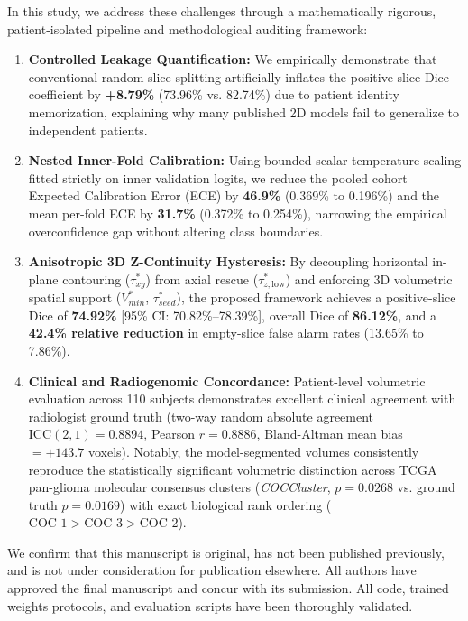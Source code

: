 \documentclass[11pt]{article}
\begin{document}
\vspace{0.6em}
In this study, we address these challenges through a mathematically rigorous, patient-isolated pipeline and methodological auditing framework:
\begin{enumerate}
    \item \textbf{Controlled Leakage Quantification:} We empirically demonstrate that conventional random slice splitting artificially inflates the positive-slice Dice coefficient by \textbf{+8.79\%} (73.96\% vs. 82.74\%) due to patient identity memorization, explaining why many published 2D models fail to generalize to independent patients.
    \item \textbf{Nested Inner-Fold Calibration:} Using bounded scalar temperature scaling fitted strictly on inner validation logits, we reduce the pooled cohort Expected Calibration Error (ECE) by \textbf{46.9\%} (0.369\% to 0.196\%) and the mean per-fold ECE by \textbf{31.7\%} (0.372\% to 0.254\%), narrowing the empirical overconfidence gap without altering class boundaries.
    \item \textbf{Anisotropic 3D Z-Continuity Hysteresis:} By decoupling horizontal in-plane contouring ($\tau_{xy}^*$) from axial rescue ($\tau_{z,\mathrm{low}}^*$) and enforcing 3D volumetric spatial support ($V_{min}^*$, $\tau_{seed}^*$), the proposed framework achieves a positive-slice Dice of \textbf{74.92\%} [95\% CI: 70.82\%--78.39\%], overall Dice of \textbf{86.12\%}, and a \textbf{42.4\% relative reduction} in empty-slice false alarm rates (13.65\% to 7.86\%).
    \item \textbf{Clinical and Radiogenomic Concordance:} Patient-level volumetric evaluation across 110 subjects demonstrates excellent clinical agreement with radiologist ground truth (two-way random absolute agreement $\text{ICC}(2, 1) = \mathbf{0.8894}$, Pearson $r = 0.8886$, Bland-Altman mean bias $= +143.7$ voxels). Notably, the model-segmented volumes consistently reproduce the statistically significant volumetric distinction across TCGA pan-glioma molecular consensus clusters (\textit{COCCluster}, $p = 0.0268$ vs. ground truth $p = 0.0169$) with exact biological rank ordering ($\text{COC 1} > \text{COC 3} > \text{COC 2}$).
\end{enumerate}

\vspace{0.6em}
We confirm that this manuscript is original, has not been published previously, and is not under consideration for publication elsewhere. All authors have approved the final manuscript and concur with its submission. All code, trained weights protocols, and evaluation scripts have been thoroughly validated.
\end{document}
